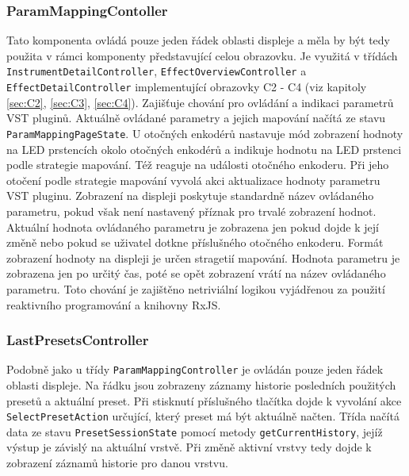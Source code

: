 \documentclass[thesis=M,czech]{FITthesis}[2019/03/06]
\begin{document}
			\subsubsection{ParamMappingContoller}
				Tato komponenta ovládá pouze jeden řádek oblasti displeje a měla by být tedy použita v rámci komponenty představující celou obrazovku.
				Je využitá v třídách \texttt{Instrument\-Detail\-Controller}, \texttt{Effect\-Overview\-Controller} a \texttt{Effect\-Detail\-Controller} implementující obrazovky C2 - C4 (viz kapitoly \ref{sec:C2}, \ref{sec:C3}, \ref{sec:C4}). Zajišťuje chování pro ovládání a indikaci parametrů VST pluginů. Aktuálně ovládané parametry a jejich mapování načítá ze stavu \texttt{Param\-Mapping\-Page\-State}.
				U otočných enkodérů nastavuje mód zobrazení hodnoty na LED prstencích okolo otočných enkodérů a indikuje hodnotu na LED prstenci podle strategie mapování. Též
				reaguje na události otočného enkoderu. Při jeho otočení podle strategie mapování vyvolá akci aktualizace hodnoty parametru VST pluginu.
				Zobrazení na displeji poskytuje standardně název ovládaného parametru, pokud však není nastavený příznak pro trvalé 
				zobrazení hodnot.
				Aktuální hodnota ovládaného parametru je zobrazena jen pokud dojde k její změně nebo pokud se uživatel dotkne příslušného otočného enkoderu.
				Formát zobrazení hodnoty na displeji je určen stragetií mapování.
				Hodnota parametru je zobrazena jen po určitý čas, poté se opět zobrazení vrátí na název ovládaného parametru. 
				Toto chování je zajištěno netriviální logikou vyjádřenou za použití reaktivního programování a knihovny RxJS.
				
			\subsubsection{LastPresetsController}
				Podobně jako u třídy \texttt{Param\-Mapping\-Controller} je ovládán pouze jeden řádek oblasti displeje. Na řádku jsou zobrazeny
				záznamy historie posledních použitých presetů a aktuální preset. Při stisknutí příslušného tlačítka dojde k vyvolání 
				akce \texttt{Select\-Preset\-Action} určující, který preset má být aktuálně načten. Třída načítá data ze stavu \texttt{Preset\-Session\-State}
				pomocí metody \texttt{get\-Current\-History}, jejíž výstup je závislý na aktuální vrstvě. Při změně aktivní vrstvy tedy dojde
				k zobrazení záznamů historie pro danou vrstvu.
							
\end{document}
